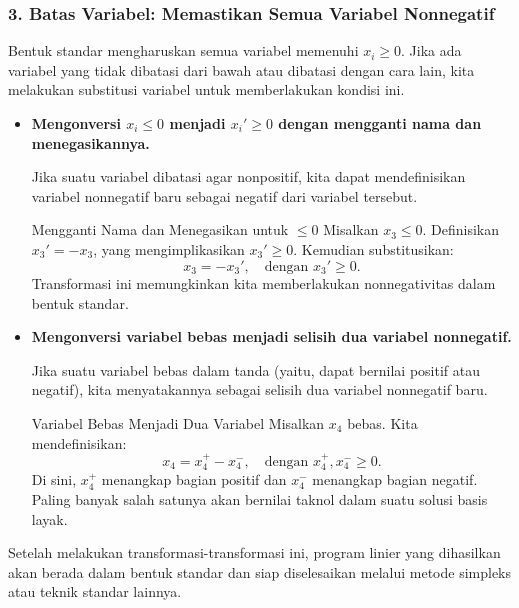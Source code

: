 \subsubsection*{3. Batas Variabel: Memastikan Semua Variabel Nonnegatif}

Bentuk standar mengharuskan semua variabel memenuhi \( x_i \geq 0 \). Jika ada variabel yang tidak dibatasi dari bawah atau dibatasi dengan cara lain, kita melakukan substitusi variabel untuk memberlakukan kondisi ini.

\begin{itemize}
    \item[(a)] \textbf{Mengonversi \( x_i \leq 0 \) menjadi \( x_i' \geq 0 \) dengan mengganti nama dan menegasikannya.}

    Jika suatu variabel dibatasi agar nonpositif, kita dapat mendefinisikan variabel nonnegatif baru sebagai negatif dari variabel tersebut.

    \begin{example}{Mengganti Nama dan Menegasikan untuk \(\leq 0\)}
    Misalkan \( x_3 \leq 0 \). Definisikan \( x_3' = -x_3 \), yang mengimplikasikan \( x_3' \geq 0 \). Kemudian substitusikan:
    \[
    x_3 = -x_3', \quad \text{dengan } x_3' \geq 0.
    \]
    Transformasi ini memungkinkan kita memberlakukan nonnegativitas dalam bentuk standar.
    \end{example}

    \item[(b)] \textbf{Mengonversi variabel bebas menjadi selisih dua variabel nonnegatif.}

    Jika suatu variabel bebas dalam tanda (yaitu, dapat bernilai positif atau negatif), kita menyatakannya sebagai selisih dua variabel nonnegatif baru.

    \begin{example}{Variabel Bebas Menjadi Dua Variabel}
    Misalkan \( x_4 \) bebas. Kita mendefinisikan:
    \[
x_4 = x_4^+ - x_4^-, \quad \text{dengan } x_4^+, x_4^- \geq 0.
    \]
    Di sini, \( x_4^+ \) menangkap bagian positif dan \( x_4^- \) menangkap bagian negatif. Paling banyak salah satunya akan bernilai taknol dalam suatu solusi basis layak.
    \end{example}
\end{itemize}

\medskip

Setelah melakukan transformasi-transformasi ini, program linier yang dihasilkan akan berada dalam bentuk standar dan siap diselesaikan melalui metode simpleks atau teknik standar lainnya.

